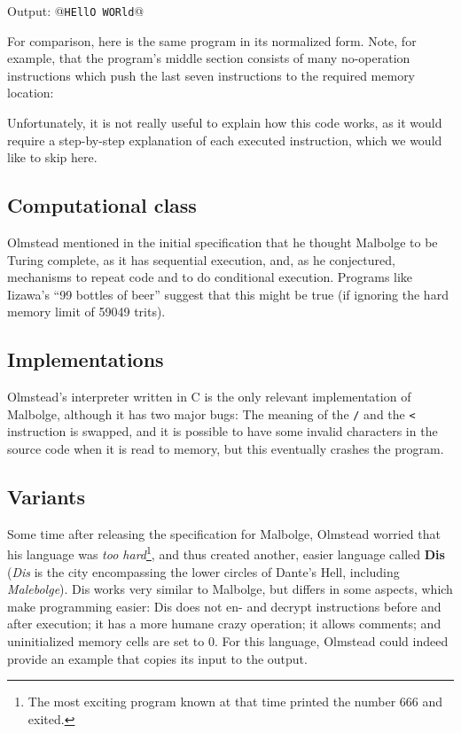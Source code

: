 \begin{io}
Output: @\texttt{HEllO WORld}@
\end{io}

For comparison, here is the same program in its normalized form. Note, for example, that the program's middle section consists of many no-operation instructions which push the last seven instructions to the required memory location:



Unfortunately, it is not really useful to explain how this code works, as it would require a step-by-step explanation of each executed instruction, which we would like to skip here.

\subsection{Computational class}

Olmstead mentioned in the initial specification that he thought Malbolge to be Turing complete, as it has sequential execution, and, as he conjectured, mechanisms to repeat code and to do conditional execution. Programs like Iizawa's “99 bottles of beer” suggest that this might be true (if ignoring the hard memory limit of 59049 trits).

\subsection{Implementations}

Olmstead's interpreter written in C \cite{olmstead1998malbolge} is the only relevant implementation of Malbolge, although it has two major bugs: The meaning of the \texttt{/} and the \texttt{<} instruction is swapped, and it is possible to have some invalid characters in the source code when it is read to memory, but this eventually crashes the program.

\subsection{Variants}

Some time after releasing the specification for Malbolge, Olmstead worried that his language was \emph{too hard}\footnote{The most exciting program known at that time printed the number 666 and exited.}, and thus created another, easier language called \textbf{Dis} (\emph{Dis} is the city encompassing the lower circles of Dante's Hell, including \emph{Malebolge}). Dis works very similar to Malbolge, but differs in some aspects, which make programming easier: Dis does not en- and decrypt instructions before and after execution; it has a more humane crazy operation; it allows comments; and uninitialized memory cells are set to 0. For this language, Olmstead could indeed provide an example that copies its input to the output.

